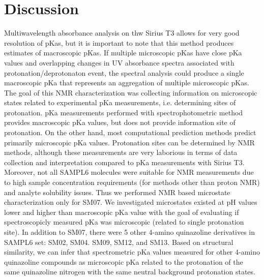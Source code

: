 \documentclass[9pt,lineno]{elife}
\begin{document}
\section{Discussion}
Multiwavelength absorbance analysis on thw Sirius T3 allows for very good resolution of pKas, but it is important to note that this method produces estimates of macroscopic pKas. If multiple microscopic pKas have close pKa values and overlapping changes in UV absorbance spectra associated with protonation/deprotonaton event, the spectral analysis could produce a single macroscopic pKa that represents an aggregation of multiple microscopic pKas.
The goal of this NMR characterization was collecting information on microscopic states related to experimental pKa measurements, i.e. determining sites of protonation. pKa measurements performed with spectrophotometric method provides macroscopic pKa values, but does not provide information site of protonation. On the other hand, most computational prediction methods predict primarily microscopic pKa values. Protonation sites can be determined by NMR methods, although these measurements are very laborious in terms of data collection and interpretation compared to pKa measurements with Sirius T3. Moreover, not all SAMPL6 molecules were suitable for NMR measurements due to high sample concentration requirements (for methods other than proton NMR) and analyte solubility issues. Thus we performed NMR based microstate characterization only for SM07. We investigated microstates existed at pH values lower and higher than macroscopic pKa value with the goal of evaluating if spectroscopicly measured pKa was microscopic (related to single protonation site).
In addition to SM07, there were 5 other 4-amino quinazoline derivatives in SAMPL6 set: SM02, SM04. SM09, SM12, and SM13. Based on structural similarity, we can infer that spectrometric pKa values measured for other 4-amino quinazoline compounds as microscopic pKa related to the protonation of the same quinazoline nitrogen with the same neutral background protonation states.
\end{document}
